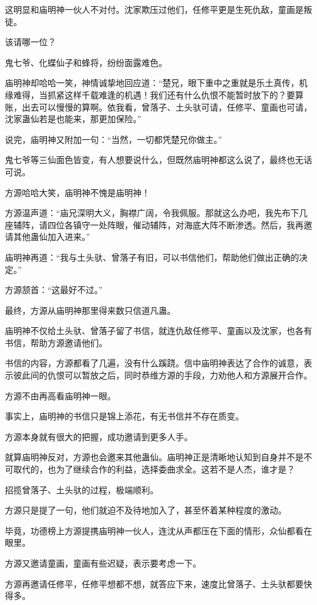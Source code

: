 \begin{this_body}
这明显和庙明神一伙人不对付。沈家欺压过他们，任修平更是生死仇敌，童画是叛徒。

该请哪一位？

鬼七爷、化蝶仙子和蜂将，纷纷面露难色。

庙明神却哈哈一笑，神情诚挚地回应道：“楚兄，眼下重中之重就是乐土真传，机缘难得，当抓紧这样千载难逢的机遇！我们还有什么仇恨不能暂时放下的？要算账，出去可以慢慢的算啊。依我看，曾落子、土头驮可请，任修平、童画也可请，沈家蛊仙若是也能来，那更加保险。”

说完，庙明神又附加一句：“当然，一切都凭楚兄你做主。”

鬼七爷等三仙面色皆变，有人想要说什么，但既然庙明神都这么说了，最终也无话可说。

方源哈哈大笑，庙明神不愧是庙明神！

方源温声道：“庙兄深明大义，胸襟广阔，令我佩服。那就这么办吧，我先布下几座辅阵，请四位各镇守一处阵眼，催动辅阵，对海底大阵不断渗透。然后，我再邀请其他蛊仙加入进来。”

庙明神再道：“我与土头驮、曾落子有旧，可以书信他们，帮助他们做出正确的决定。”

方源颔首：“这最好不过。”

最终，方源从庙明神那里得来数只信道凡蛊。

庙明神不仅给土头驮、曾落子留了书信，就连仇敌任修平、童画以及沈家，也各有书信，帮助方源邀请他们。

书信的内容，方源都看了几遍，没有什么蹊跷。信中庙明神表达了合作的诚意，表示彼此间的仇恨可以暂放之后，同时恭维方源的手段，力劝他人和方源展开合作。

方源不由再高看庙明神一眼。

事实上，庙明神的书信只是锦上添花，有无书信并不存在质变。

方源本身就有很大的把握，成功邀请到更多人手。

就算庙明神反对，方源也会邀来其他蛊仙。庙明神正是清晰地认知到自身并不是不可取代的，也为了继续合作的利益，选择委曲求全。这若不是人杰，谁才是？

招揽曾落子、土头驮的过程，极端顺利。

方源只是提了一句，他们就迫不及待地加入了，甚至怀着某种程度的激动。

毕竟，功德榜上方源提携庙明神一伙人，连沈从声都压在下面的情形，众仙都看在眼里。

方源又邀请童画，童画有些迟疑，表示要考虑一下。

方源再邀请任修平，任修平想都不想，就答应下来，速度比曾落子、土头驮都要快得多。


\end{this_body}
